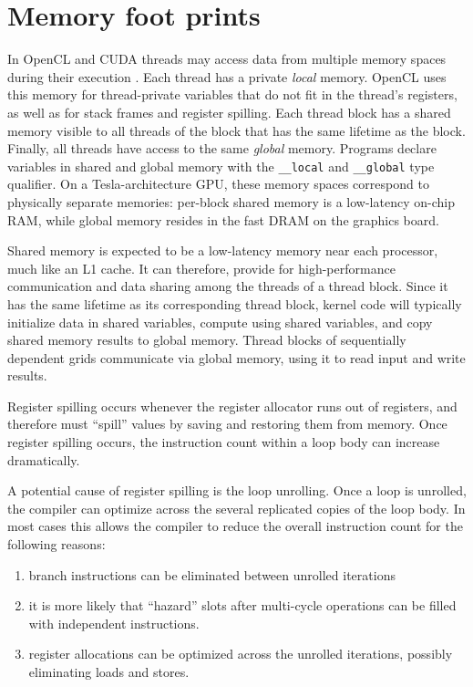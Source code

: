 \section{Memory foot prints}\label{sec:memory}
In OpenCL and CUDA threads may access data from multiple memory spaces during their execution \cite{Nickolls2008}. Each thread has a private \textit{local} memory. 
OpenCL uses this memory for thread-private variables that do not fit in the thread's registers, as well as for stack frames and register spilling. Each thread block 
has a shared memory visible to all threads of the block that has the same lifetime as the block. Finally, all threads have access to the same \textit{global} memory. 
Programs declare variables in shared and global memory with the \texttt{\_\_local} and \texttt{\_\_global} type qualifier. On a Tesla-architecture GPU, these memory spaces correspond to 
physically separate memories: per-block shared memory is a low-latency on-chip RAM, while global memory resides in the fast DRAM on the graphics board. 

Shared memory is expected to be a low-latency memory near each processor, much like an L1 cache. It can therefore, provide for high-performance communication and
data sharing among the threads of a thread block. Since it has the same lifetime as its corresponding thread block, kernel code will typically initialize data in shared
variables, compute using shared variables, and copy shared memory results to global memory. Thread blocks of sequentially dependent grids communicate via global
memory, using it to read input and write results. 

Register spilling occurs whenever the register allocator runs out of registers, and therefore must ``spill'' values by saving and restoring them from memory. Once 
register spilling occurs, the instruction count within a loop body can increase dramatically. 
 
A potential cause of register spilling is the loop unrolling. Once a loop is unrolled, the compiler can optimize across the several replicated copies of the loop 
body. In most cases this allows the compiler to reduce the overall instruction count for the following reasons:
 
 \begin{enumerate}
  \item branch instructions can be eliminated between unrolled iterations
  \item it is more likely that ``hazard'' slots after multi-cycle operations can be filled with independent instructions. 
  \item register allocations can be optimized across the unrolled iterations, possibly eliminating loads and stores.
 \end{enumerate}

